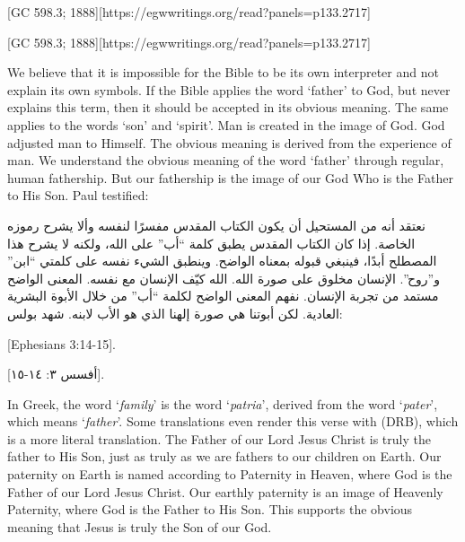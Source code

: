 [GC 598.3; 1888][https://egwwritings.org/read?panels=p133.2717]


[GC 598.3; 1888][https://egwwritings.org/read?panels=p133.2717]


We believe that it is impossible for the Bible to be its own interpreter and not explain its own symbols. If the Bible applies the word ‘father’ to God, but never explains this term, then it should be accepted in its obvious meaning. The same applies to the words ‘son’ and ‘spirit’. Man is created in the image of God. God adjusted man to Himself. The obvious meaning is derived from the experience of man. We understand the obvious meaning of the word ‘father’ through regular, human fathership. But our fathership is the image of our God Who is the Father to His Son. Paul testified:


نعتقد أنه من المستحيل أن يكون الكتاب المقدس مفسرًا لنفسه وألا يشرح رموزه الخاصة. إذا كان الكتاب المقدس يطبق كلمة “أب” على الله، ولكنه لا يشرح هذا المصطلح أبدًا، فينبغي قبوله بمعناه الواضح. وينطبق الشيء نفسه على كلمتي “ابن” و”روح”. الإنسان مخلوق على صورة الله. الله كيّف الإنسان مع نفسه. المعنى الواضح مستمد من تجربة الإنسان. نفهم المعنى الواضح لكلمة “أب” من خلال الأبوة البشرية العادية. لكن أبوتنا هي صورة إلهنا الذي هو الأب لابنه. شهد بولس:


[Ephesians 3:14-15].


[أفسس ٣: ١٤-١٥].


In Greek, the word ‘\textit{family}’ is the word ‘\textit{patria}’, derived from the word ‘\textit{pater}’, which means ‘\textit{father}’. Some translations even render this verse with  (DRB), which is a more literal translation. The Father of our Lord Jesus Christ is truly the father to His Son, just as truly as we are fathers to our children on Earth. Our paternity on Earth is named according to Paternity in Heaven, where God is the Father of our Lord Jesus Christ. Our earthly paternity is an image of Heavenly Paternity, where God is the Father to His Son. This supports the obvious meaning that Jesus is truly the Son of our God.


